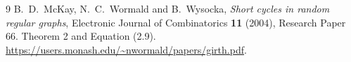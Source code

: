 \documentclass[11pt]{article}
\begin{document}
\begin{thebibliography}{9}
B.~D.~McKay, N.~C.~Wormald and B.~Wysocka,
\emph{Short cycles in random regular graphs},
Electronic Journal of Combinatorics \textbf{11} (2004), Research Paper 66.
Theorem 2 and Equation (2.9).
\url{https://users.monash.edu/~nwormald/papers/girth.pdf}.
\end{thebibliography}
\end{document}
